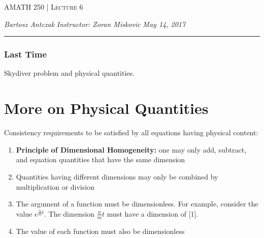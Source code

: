 \documentclass{report}
\newcommand{\lectureNum}{6}
\newcommand{\curDate}{May 14, 2017}
\newcommand{\course}{AMATH 250}
\newcommand{\instructor}{Zoran Miskovic}
\begin{document}
\begin{center}
\begin{Large}
\textsc{\course{} | Lecture \lectureNum{}}
\end{Large}
\end{center} 
\noindent \textit{Bartosz Antczak} \hfill
\textit{Instructor: \instructor{}} \hfill
\textit{\curDate{}}
\rule{\textwidth}{0.4pt}
\subsubsection{Last Time}
Skydiver problem and physical quantities.
\section{More on Physical Quantities}
Consistency requirements to be satisfied by all equations having physical content:
\begin{enumerate}
    \item \textbf{Principle of Dimensional Homogeneity:} one may only add, subtract, and equation quantities that have the same dimension
    \item Quantities having different dimensions may only be combined by multiplication or division
    \item The argument of a function must be dimensionless. For example, consider the value $e^{\frac{\alpha}{m}t}$. The dimension $\frac{\alpha}{m}t$ must have a dimension of [1].
    \item The value of each function must also be dimensionless
\end{enumerate}
\end{document}
